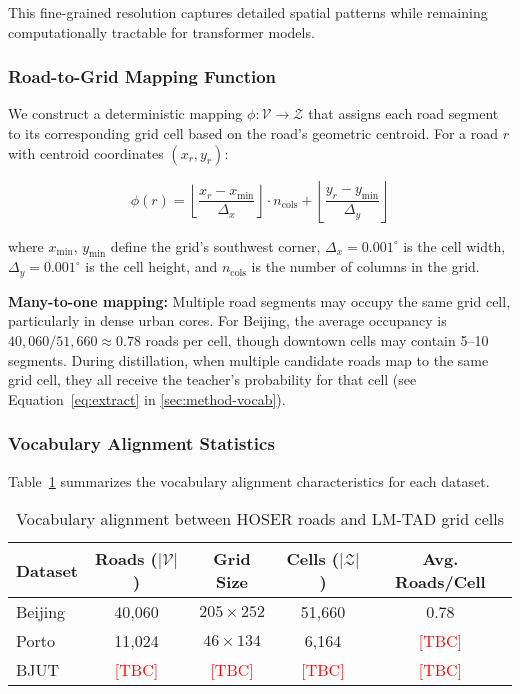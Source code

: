 This fine-grained resolution captures detailed spatial patterns while remaining computationally tractable for transformer models.

\subsubsection{Road-to-Grid Mapping Function}

We construct a deterministic mapping $\phi: \mathcal{V} \rightarrow \mathcal{Z}$ that assigns each road segment to its corresponding grid cell based on the road's geometric centroid. For a road $r$ with centroid coordinates $(x_r, y_r)$:

\begin{equation}
\phi(r) = \left\lfloor \frac{x_r - x_{\min}}{\Delta_x} \right\rfloor \cdot n_{\text{cols}} + \left\lfloor \frac{y_r - y_{\min}}{\Delta_y} \right\rfloor
\label{eq:road-to-grid}
\end{equation}

where $x_{\min}$, $y_{\min}$ define the grid's southwest corner, $\Delta_x = 0.001^\circ$ is the cell width, $\Delta_y = 0.001^\circ$ is the cell height, and $n_{\text{cols}}$ is the number of columns in the grid.

\textbf{Many-to-one mapping:} Multiple road segments may occupy the same grid cell, particularly in dense urban cores. For Beijing, the average occupancy is $40{,}060 / 51{,}660 \approx 0.78$ roads per cell, though downtown cells may contain 5--10 segments. During distillation, when multiple candidate roads map to the same grid cell, they all receive the teacher's probability for that cell (see Equation~\ref{eq:extract} in \autoref{sec:method-vocab}).

\subsubsection{Vocabulary Alignment Statistics}

Table~\ref{tab:vocab-alignment} summarizes the vocabulary alignment characteristics for each dataset.

\begin{table}[h]
\centering
\caption{Vocabulary alignment between HOSER roads and LM-TAD grid cells}
\label{tab:vocab-alignment}
\small
\begin{tabular}{lcccc}
\toprule
\textbf{Dataset} & \textbf{Roads ($|\mathcal{V}|$)} & \textbf{Grid Size} & \textbf{Cells ($|\mathcal{Z}|$)} & \textbf{Avg. Roads/Cell} \\
\midrule
Beijing & 40,060 & $205 \times 252$ & 51,660 & 0.78 \\
Porto & 11,024 & $46 \times 134$ & 6,164 & \textcolor{red}{[TBC]} \\
BJUT & \textcolor{red}{[TBC]} & \textcolor{red}{[TBC]} & \textcolor{red}{[TBC]} & \textcolor{red}{[TBC]} \\
\bottomrule
\end{tabular}
\end{table}

